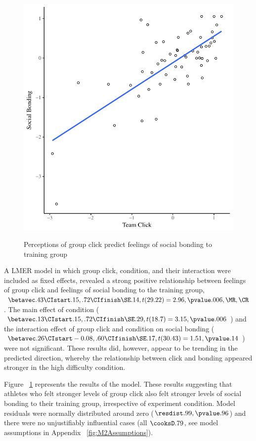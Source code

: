 \begin{figure}
  \centering
    \includegraphics[width=0.5\linewidth,keepaspectratio] {images/groupClickBondScatter}
    \label{fig:groupClickBondScatter}
    \caption{Perceptions of group click predict feelings of social bonding to training group}
\end{figure}

A LMER model in which group click, condition, and their interaction were included as fixed effects, revealed a strong positive relationship between feelings of group click and feelings of social bonding to the training group, $\betavec .43 \CIstart .15, .72 \CIfinish \SE .14, t(29.22) = 2.96, \pvalue .006, \MR , \CR $.
The main effect of condition ($\betavec .13 \CIstart .15, .72 \CIfinish \SE .29, t(18.7) = 3.15, \pvalue .006$) and the interaction effect of group click and condition on social bonding ($\betavec .26 \CIstart -0.08, .60 \CIfinish \SE .17, t(30.43) = 1.51, \pvalue .14$) were not significant.  These results did, however, appear to be trending in the predicted direction, whereby the relationship between click and bonding appeared stronger in the high difficulty condition.

Figure ~\ref{fig:groupClickBondScatter} represents the results of the model.  These results suggesting that athletes who felt stronger levels of group click also felt stronger levels of social bonding to their training group, irrespective of experiment condition.  Model residuals were normally distributed around zero ($\resdist .99, \pvalue .96$) and there were no unjustifiably influential cases (all $\cooksD .79$, see model assumptions in Appendix ~\ref{fig:M2Assumptions}).








